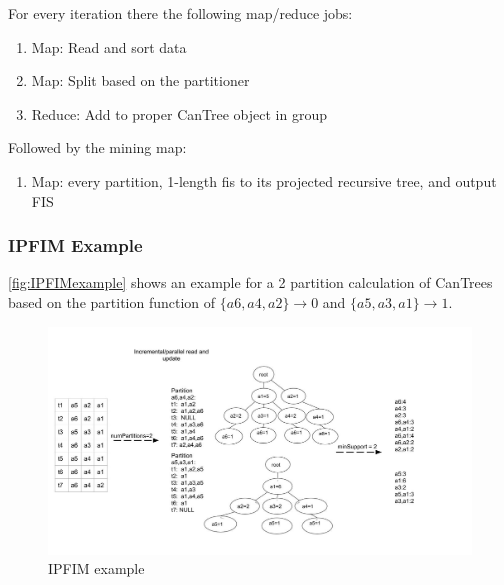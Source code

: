 For every iteration there the following map/reduce jobs:
\begin{enumerate}
\item Map: Read and sort data
\item Map: Split based on the partitioner
\item Reduce: Add to proper CanTree object in group
\end{enumerate}
Followed by the mining map:
\begin{enumerate}
\item Map: every partition, 1-length fis to its projected recursive tree, and output FIS
\end{enumerate}

\subsubsection{IPFIM Example}
 \autoref{fig:IPFIMexample} shows an example for a 2 partition calculation of CanTrees based on the partition function of $\{a6,a4,a2\}\to 0$ and $\{a5,a3,a1\}\to 1$.
\begin{figure}
  \centering
  \includegraphics[width=\linewidth]{figures/IncrementalTreeMining1}
  \caption{IPFIM example}
  \label{fig:IPFIMexample}
\end{figure}



